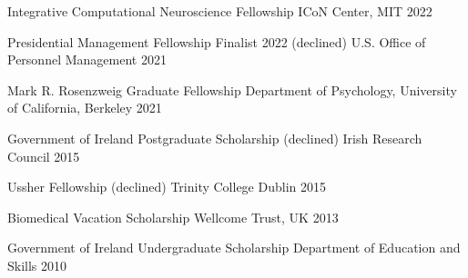 

\begin{cvhonors}

 \cvhonor
    {Integrative Computational Neuroscience Fellowship} %
    {ICoN Center, MIT}
    {} %
    {2022}

 \cvhonor
    {Presidential Management Fellowship Finalist 2022 (declined)} %
    {U.S. Office of Personnel Management}
    {} %
    {2021}

 \cvhonor
    {Mark R. Rosenzweig Graduate Fellowship} %
    {Department of Psychology, University of California, Berkeley}
    {} %
    {2021}

 \cvhonor
   {Government of Ireland Postgraduate Scholarship (declined)}
   {Irish Research Council}
   {} %
   {2015}
   
 \cvhonor
   {Ussher Fellowship (declined)}
   {Trinity College Dublin}
   {} %
   {2015}

  \cvhonor
   {Biomedical Vacation Scholarship}
   {Wellcome Trust, UK}
   {} %
   {2013}

  \cvhonor
   {Government of Ireland Undergraduate Scholarship}
   {Department of Education and Skills}
   {} %
   {2010}
   
\end{cvhonors}


